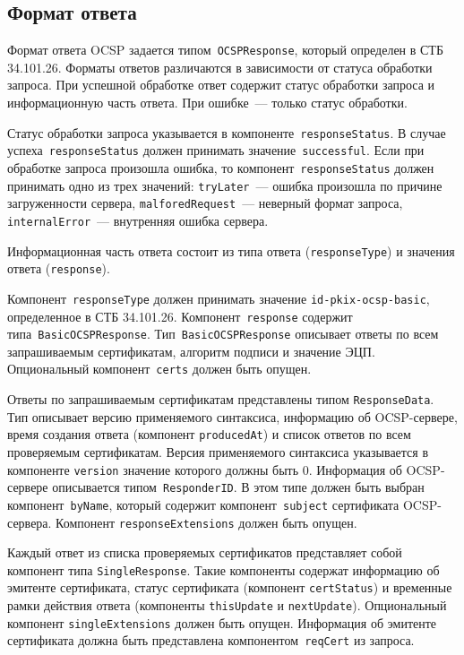 \subsection{Формат ответа}

Формат ответа OCSP задается типом~\texttt{OCSPResponse}, который определен 
в СТБ 34.101.26.  Форматы ответов различаются в зависимости от статуса 
обработки запроса. При успешной обработке ответ содержит статус обработки 
запроса и информационную часть ответа. При ошибке~--- только статус обработки.

Статус обработки запроса указывается в компоненте~\texttt{responseStatus}.
%
В случае успеха~\texttt{responseStatus} должен принимать значение~\texttt{successful}.
%
Если при обработке запроса произошла ошибка, то 
компонент~\texttt{responseStatus} должен принимать одно из трех значений: 
\texttt{tryLater}~--- ошибка произошла по причине загруженности сервера, 
\texttt{malforedRequest}~--- неверный формат запроса, 
\texttt{internalError}~--- внутренняя ошибка сервера.

Информационная часть ответа состоит из типа ответа
(\texttt{responseType}) и значения ответа (\texttt{response}).
 
Компонент~\texttt{responseType} должен принимать значение
\texttt{id-pkix-ocsp-basic}, определенное в СТБ 34.101.26. 
Компонент~\texttt{response} содержит  
типа~\texttt{BasicOCSPResponse}. Тип~\texttt{BasicOCSPResponse} описывает 
ответы по всем запрашиваемым сертификатам, алгоритм подписи и значение  
ЭЦП. Опциональный компонент~\texttt{certs} должен быть опущен.


Ответы по запрашиваемым сертификатам представлены типом 
\texttt{ResponseData}. Тип описывает версию применяемого синтаксиса, 
информацию об OCSP-сервере, время создания ответа (компонент 
\texttt{producedAt}) и список ответов по всем проверяемым сертификатам. 
Версия применяемого синтаксиса указывается в компоненте
\texttt{version}\addendum{,} значение которого должны быть $0$. 
Информация об OCSP-сервере описывается типом~\texttt{ResponderID}.
В этом типе должен быть выбран компонент~\texttt{byName},
который содержит компонент~\texttt{subject} 
сертификата OCSP-сервера. Компонент \texttt{responseExtensions} должен быть опущен.


Каждый ответ из списка проверяемых сертификатов представляет собой
компонент типа \texttt{SingleResponse}. Такие компоненты содержат
информацию об эмитенте сертификата, статус сертификата (компонент
\texttt{certStatus}) и временные рамки действия ответа (компоненты
\texttt{thisUpdate} и \texttt{nextUpdate}). Опциональный компонент
\texttt{singleExtensions} должен быть опущен. Информация об эмитенте
сертификата должна быть представлена компонентом~\texttt{reqCert} из
запроса.

